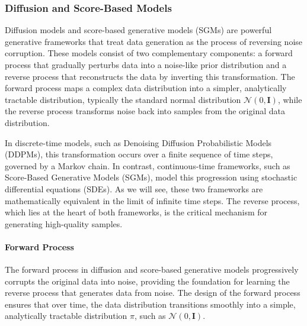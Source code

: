 \subsubsection{Diffusion and Score-Based Models}

Diffusion models \cite{ho2020denoising} and score-based generative models (SGMs) \cite{song2021sde} are powerful generative frameworks that treat data generation as the process of reversing noise corruption. These models consist of two complementary components: a forward process that gradually perturbs data into a noise-like prior distribution and a reverse process that reconstructs the data by inverting this transformation. The forward process maps a complex data distribution into a simpler, analytically tractable distribution, typically the standard normal distribution \( \mathcal{N}(0, \mathbf{I}) \), while the reverse process transforms noise back into samples from the original data distribution.

In discrete-time models, such as Denoising Diffusion Probabilistic Models (DDPMs), this transformation occurs over a finite sequence of time steps, governed by a Markov chain. In contrast, continuous-time frameworks, such as Score-Based Generative Models (SGMs), model this progression using stochastic differential equations (SDEs). As we will see, these two frameworks are mathematically equivalent in the limit of infinite time steps. The reverse process, which lies at the heart of both frameworks, is the critical mechanism for generating high-quality samples.

\paragraph{Forward Process}

The forward process in diffusion and score-based generative models progressively corrupts the original data into noise, providing the foundation for learning the reverse process that generates data from noise. The design of the forward process ensures that over time, the data distribution transitions smoothly into a simple, analytically tractable distribution $\pi$, such as \( \mathcal{N}(0, \mathbf{I}) \).

